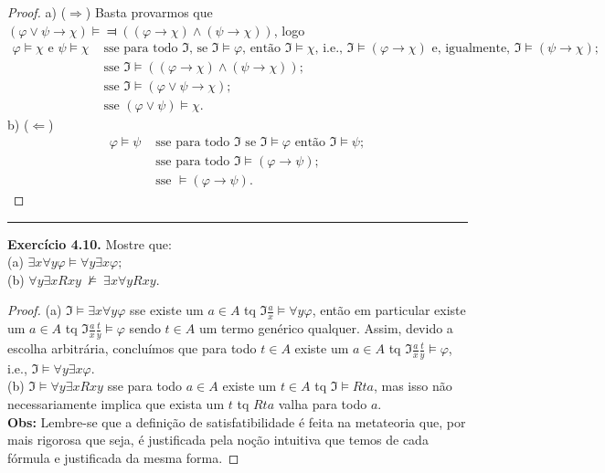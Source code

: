 \documentclass[11pt]{article}
\theoremstyle{definition}
\newcommand{\mf}[1]{\mathfrak{#1}}
\begin{document}
\begin{proof}
    a) ($\Rightarrow$) Basta provarmos que $(\varphi\vee\psi\rightarrow\chi)\vDash\Dashv((\varphi\rightarrow\chi)\wedge(\psi\rightarrow\chi))$, logo
    \begin{align*}
        \varphi\vDash\chi\text{ e }\psi\vDash\chi &\text{ sse para todo }\mf{I}\text{, se }\mf{I}\vDash\varphi\text{, então }\mf{I}\vDash\chi\text{, i.e., }\mf{I}\vDash(\varphi\rightarrow\chi)\text{ e, igualmente, }\mf{I}\vDash(\psi\rightarrow\chi);\\
        &\text{ sse }\mf{I}\vDash((\varphi\rightarrow\chi)\wedge(\psi\rightarrow\chi));\\
        &\text{ sse }\mf{I}\vDash(\varphi\vee\psi\rightarrow\chi);\\
        &\text{ sse }(\varphi\vee\psi)\vDash\chi.
    \end{align*}
    b) ($\Leftarrow$)
    \begin{align*}
        \varphi\vDash\psi & \text{ sse para todo }\mf{I}\text{ se }\mf{I}\vDash\varphi\text{ então }\mf{I}\vDash\psi;\\
        & \text{ sse para todo }\mf{I}\vDash(\varphi\to\psi);\\
        & \text{ sse }\vDash(\varphi\to\psi).
    \end{align*}
\end{proof}

\hrule

\textbf{Exercício 4.10.}
Mostre que:\\
(a) $\exists x\forall y\varphi\vDash\forall y\exists x\varphi;$\\
(b) $\forall y\exists xRxy~\nvDash~\exists x\forall yRxy$.

\begin{proof}
(a) $\mf{I}\vDash\exists x\forall y\varphi$ sse existe um $a\in A$ tq $\mf{I}\frac{a}{x}\vDash\forall y\varphi$, então em particular existe um $a\in A$ tq $\mf{I}\frac{a}{x}\frac{t}{y}\vDash\varphi$ sendo $t\in A$ um termo genérico qualquer. Assim, devido a escolha arbitrária, concluímos que para todo $t\in A$ existe um $a\in A$ tq $\mf{I}\frac{a}{x}\frac{t}{y}\vDash\varphi$, i.e., $\mf{I}\vDash\forall y\exists x\varphi$.\\
(b) $\mf{I}\vDash\forall y\exists xRxy$ sse para todo $a\in A$ existe um $t\in A$ tq $\mf{I}\vDash Rta$, mas isso não necessariamente implica que exista um $t$ tq $Rta$ valha para todo $a$.\\
\textbf{Obs:} Lembre-se que a definição de satisfatibilidade é feita na metateoria que, por mais rigorosa que seja, é justificada pela noção intuitiva que temos de cada fórmula e justificada da mesma forma.
\end{proof}
\end{document}
